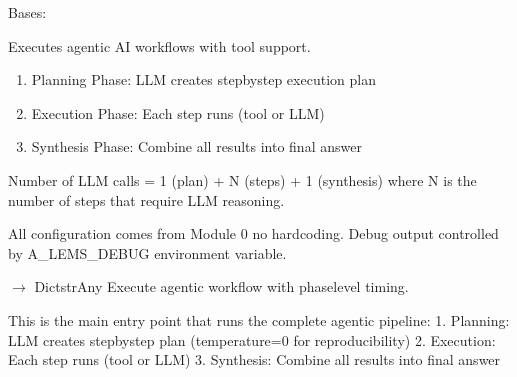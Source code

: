 \documentclass[letterpaper,10pt,english]{sphinxmanual}
\begin{document}
\begin{fulllineitems}
\label{\detokenize{core.execution.agentic:core.execution.agentic.AgenticExecutor}}
\pysigstartsignatures
\pysiglinewithargsret
{}
{}
{}
\pysigstopsignatures
\sphinxAtStartPar
Bases: 

\sphinxAtStartPar
Executes agentic AI workflows with tool support.
\begin{description}
\begin{enumerate}
%
\item {} 
\sphinxAtStartPar
Planning Phase: LLM creates step\sphinxhyphen{}by\sphinxhyphen{}step execution plan

\item {} 
\sphinxAtStartPar
Execution Phase: Each step runs (tool or LLM)

\item {} 
\sphinxAtStartPar
Synthesis Phase: Combine all results into final answer

\end{enumerate}

\end{description}

\sphinxAtStartPar
Number of LLM calls = 1 (plan) + N (steps) + 1 (synthesis)
where N is the number of steps that require LLM reasoning.

\sphinxAtStartPar
All configuration comes from Module 0 \textendash{} no hardcoding.
Debug output controlled by A\_LEMS\_DEBUG environment variable.

\begin{fulllineitems}
\label{\detokenize{core.execution.agentic:core.execution.agentic.AgenticExecutor.execute}}
\pysigstartsignatures
\pysiglinewithargsret
{}
{\sphinxparamcomma {}}
{{ $\rightarrow$ Dict\DUrole{p}{{[}}strAny\DUrole{p}{{]}}}}
\pysigstopsignatures
\sphinxAtStartPar
Execute agentic workflow with phase\sphinxhyphen{}level timing.
\begin{description}
\sphinxAtStartPar
This is the main entry point that runs the complete agentic pipeline:
1. Planning: LLM creates step\sphinxhyphen{}by\sphinxhyphen{}step plan (temperature=0 for reproducibility)
2. Execution: Each step runs (tool or LLM)
3. Synthesis: Combine all results into final answer


\end{description}
\end{fulllineitems}
\end{fulllineitems}
\end{document}
